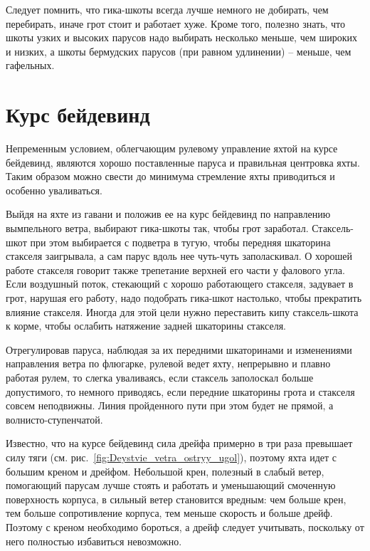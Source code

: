 \documentclass[a4paper, 12pt, twoside, final]{scrbook}
\begin{document}
Следует помнить, что гика-шкоты всегда лучше немного не добирать, чем перебирать, иначе грот стоит и работает хуже. Кроме того, полезно знать, что шкоты узких и высоких парусов надо выбирать несколько меньше, чем широких и низких, а шкоты бермудских парусов (при равном удлинении) \--- меньше, чем гафельных.

\section{Курс бейдевинд}

Непременным условием, облегчающим рулевому управление яхтой на курсе бейдевинд, являются хорошо поставленные паруса и правильная центровка яхты. Таким образом можно свести до минимума стремление яхты приводиться и особенно уваливаться.

Выйдя на яхте из гавани и положив ее на курс бейдевинд по направлению вымпельного ветра, выбирают гика-шкоты так, чтобы грот заработал. Стаксель-шкот при этом выбирается с подветра в тугую, чтобы передняя шкаторина стакселя заигрывала, а сам парус вдоль нее чуть-чуть заполаскивал. О хорошей работе стакселя говорит также трепетание верхней его части у фалового угла. Если воздушный поток, стекающий с хорошо работающего стакселя, задувает в грот, нарушая его работу, надо подобрать гика-шкот настолько, чтобы прекратить влияние стакселя. Иногда для этой цели нужно переставить кипу стаксель-шкота к корме, чтобы ослабить натяжение задней шкаторины стакселя.

Отрегулировав паруса, наблюдая за их передними шкаторинами и изменениями направления ветра по флюгарке, рулевой ведет яхту, непрерывно и плавно работая рулем, то слегка уваливаясь, если стаксель заполоскал больше допустимого, то немного приводясь, если передние шкаторины грота и стакселя совсем неподвижны. Линия пройденного пути при этом будет не прямой, а волнисто-ступенчатой.

Известно, что на курсе бейдевинд сила дрейфа примерно в три раза превышает силу тяги (см. рис.~\ref{fig:Deystvie_vetra_ostryy_ugol}), поэтому яхта идет с большим креном и дрейфом. Небольшой крен, полезный в слабый ветер, помогающий парусам лучше стоять и работать и уменьшающий смоченную поверхность корпуса, в сильный ветер становится вредным: чем больше крен, тем больше сопротивление корпуса, тем меньше скорость и больше дрейф. Поэтому с креном необходимо бороться, а дрейф следует учитывать, поскольку от него полностью избавиться невозможно.
\end{document}
